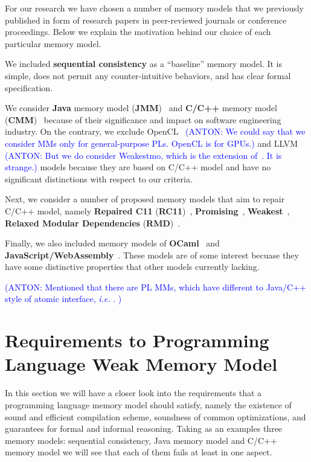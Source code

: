 \documentclass[a4paper,twoside,11pt]{article}
\newcommand{\app}[1]{\textcolor{blue}{(ANTON: #1)}}
\numberwithin{equation}{section}
\begin{document}
For our research we have chosen a number of memory models 
that we previously published 
in form of research papers in peer-reviewed journals or conference proceedings. 
Below we explain the motivation behind our choice of each particular memory model.  

We included \textbf{sequential consistency} as a ``baseline'' memory model. 
It is simple, does not permit any counter-intuitive behaviors,
and has clear formal specification.

We consider \textbf{Java} memory model (\textbf{JMM})~\cite{Manson-al:POPL05}
and \textbf{C/C++} memory model (\textbf{CMM})~\cite{Boehm-Adve:PLDI08, Batty-al:POPL11}
because of their significance and impact on software engineering industry.
On the contrary, we exclude OpenCL~\cite{Batty-el:POPL16}
\app{We could say that we consider MMs only for general-purpose PLs. OpenCL is for GPUs.}
and LLVM~\cite{Chakraborty-Vafeiadis:CGO17}
\app{But we do consider Weakestmo, which is the extension of~\cite{Chakraborty-Vafeiadis:CGO17}.
It is strange.}
models because they are based on C/C++ model and have no significant distinctions
with respect to our criteria.

Next, we consider a number of proposed memory models 
that aim to repair C/C++ model, namely 
\textbf{Repaired C11} (\textbf{RC11})~\cite{Lahav-al:PLDI17}, 
\textbf{Promising}~\cite{Kang-al:POPL17, Lee-el:PLDI20}, 
\textbf{Weakest}~\cite{Chakraborty-Vafeiadis:POPL19}, 
\textbf{Relaxed Modular Dependencies} (\textbf{RMD})~\cite{Paviotti-el:ESOP20}.

Finally, we also included memory models of \textbf{OCaml}~\cite{Dolan-al:PLDI18}
and \textbf{JavaScript/WebAssembly}~\cite{Watt-el:PLDI2020}.
These models are of some interest becuase 
they have some distinctive properties
that other models currently lacking.

\app{Mentioned that there are PL MMs, which have different to Java/C++ style of
  atomic interface, \emph{i.e.} \cite{Crary-Sullivan:POPL15}.
}

\section{Requirements to Programming Language Weak Memory Model}

In this section we will have a closer look into the requirements 
that a programming language memory model should satisfy, 
namely the existence of sound and efficient compilation scheme, 
soundness of common optimizations, and guarantees for formal and informal reasoning.  
Taking as an examples three memory models: 
sequential consistency, Java memory model and C/C++ memory model
we will see that each of them fails at least in one aspect.
\end{document}
